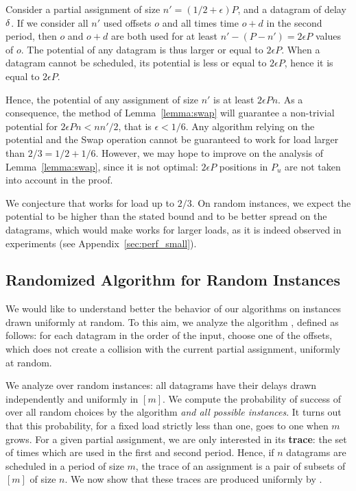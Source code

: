 Consider a partial assignment of size $n' = (1/2 + \epsilon)P$, and a datagram of delay $\delta$.
If we consider all $n'$ used offsets $o$ and all times time $o+d$ in the second period, 
then $o$ and $o+d$ are both used for at least $n' - (P -n') = 2\epsilon P$ values of $o$.
The potential of any datagram is thus larger or equal to $2\epsilon P$. When a datagram cannot be scheduled, its potential is less or equal to $2\epsilon P$, hence it is equal to $2\epsilon P$.

Hence, the potential of any assignment of size $n'$ is at least $2\epsilon P n $. As a consequence, the method of Lemma~\ref{lemma:swap} will guarantee a non-trivial potential for $2\epsilon P n <  nn'/2$, that is $\epsilon < 1/6$. Any algorithm relying on the potential and the Swap operation cannot be guaranteed to work for load larger than $2/3 = 1/2 + 1/6$. However, we may hope to improve on the analysis of Lemma~\ref{lemma:swap}, since it is not optimal: $2\epsilon P$ positions in $P_{u}$ are not taken into account in the proof. 

We conjecture that \swapandmove works for load up to $2/3$. 
On random instances, we expect the potential to be higher than the stated bound and to be better spread on the datagrams, which would make \swapandmove works for larger loads, as it is indeed observed in experiments (see Appendix~\ref{sec:perf_small}).

\subsection{Randomized Algorithm for Random Instances}

We would like to understand better the behavior of our algorithms
on instances drawn uniformly at random. To this aim, we analyze the algorithm \greedyuniform, defined as follows: for each datagram in the order of the input, choose one of the offsets, which does not create a collision with the current partial assignment, uniformly at random. 

We analyze \greedyuniform over random instances:  all datagrams have 
their delays drawn independently and uniformly in $[m]$. We compute the probability of success of \greedyuniform over all random choices by the algorithm \emph{and all possible instances}. 
It turns out that this probability, for a fixed load strictly less than one, goes to one when $m$ grows. 
For a given partial assignment, we are only interested in its \textbf{trace}: the set of times which are used in the first and second period. Hence, if $n$ datagrams are scheduled in a period of size $m$, the trace of an assignment is a pair of subsets of $[m]$ of size $n$. We now show that these traces are produced uniformly by \greedyuniform.

